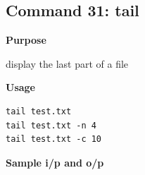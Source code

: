 \subsection{Command 31: tail} 
\textbf{Purpose}
\begin{flushleft}
 display the last part of a file
\end{flushleft}
\textbf{Usage}
\begin{verbatim}
tail test.txt
tail test.txt -n 4
tail test.txt -c 10
\end{verbatim}
\textbf{Sample i/p and o/p}
\begin{figure}[H] 
\end{figure}

